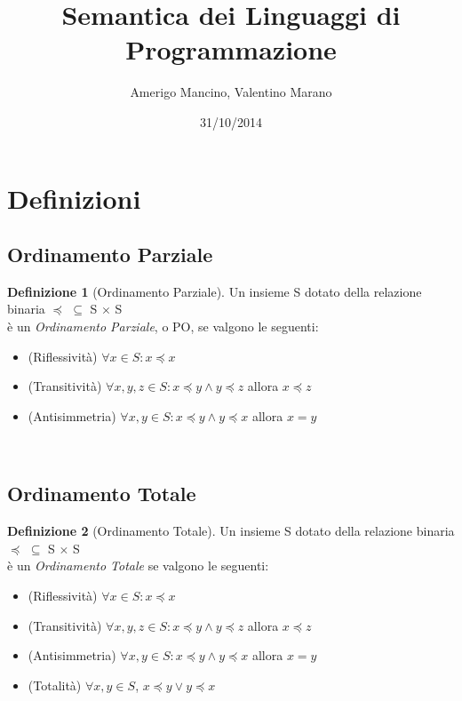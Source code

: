\documentclass[a4paper, 10pt]{article} %
\begin{document}
\frenchspacing %

\title{Semantica dei Linguaggi di Programmazione}
\author{Amerigo Mancino, Valentino Marano}
\date{31/10/2014}

\maketitle %

\tableofcontents
\newpage

\section{Definizioni}

\theoremstyle{definition}
\newtheorem{definizione}{Definizione}

\subsection{Ordinamento Parziale}
\begin{definizione}[Ordinamento Parziale]
  Un insieme S dotato della relazione binaria $\preceq$ $\subseteq$ S $\times$ S\\
  è un \emph{Ordinamento Parziale}, o PO, se valgono le seguenti:
  \begin{itemize}
  \item (Riflessività) $ \forall x \in S : x \preceq x $
  \item (Transitività) $ \forall x,y,z \in S : x \preceq y \land y \preceq z $ allora $ x \preceq z $
  \item (Antisimmetria) $ \forall x,y \in S : x \preceq y \land y \preceq x $ allora $ x = y $
  \end{itemize}
\end{definizione}

\
\subsection{Ordinamento Totale}
\begin{definizione}[Ordinamento Totale]
  Un insieme S dotato della relazione binaria $\preceq$ $\subseteq$ S $\times$ S\\
  è un \emph{Ordinamento Totale} se valgono le seguenti:
  \begin{itemize}
  \item (Riflessività) $ \forall x \in S : x \preceq x $
  \item (Transitività) $ \forall x,y,z \in S : x \preceq y \land y \preceq z $ allora $ x \preceq z $
  \item (Antisimmetria) $ \forall x,y \in S : x \preceq y \land y \preceq x $ allora $ x = y $
  \item (Totalità) $ \forall x,y \in S$, $ x \preceq y \vee y \preceq x $
  \end{itemize}
\end{definizione}
\end{document}
